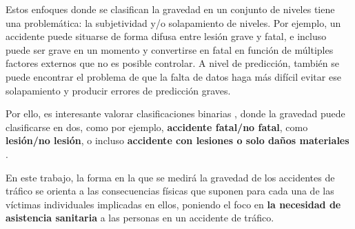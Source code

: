 Estos enfoques donde se clasifican la gravedad en un conjunto de niveles tiene una problemática: la subjetividad y/o solapamiento de niveles. Por ejemplo, un accidente puede situarse de forma difusa entre lesión grave y fatal, e incluso puede ser grave en un momento y convertirse en fatal en función de múltiples factores externos que no es posible controlar. A nivel de predicción, también se puede encontrar el problema de que la falta de datos haga más difícil evitar ese solapamiento y producir errores de predicción graves.

Por ello, es interesante valorar clasificaciones binarias \cite{prati2017using, hosseinzadeh2021investigating}, donde la gravedad puede clasificarse en dos, como por ejemplo, \textbf{accidente fatal/no fatal}, como \textbf{lesión/no lesión}, o incluso \textbf{accidente con lesiones o solo daños materiales }\cite{zhang2022hybrid, ma2021analytic}.



En este trabajo, la forma en la que se medirá la gravedad de los accidentes de tráfico se orienta a las consecuencias físicas que suponen para cada una de las víctimas individuales implicadas en ellos, poniendo el foco en \textbf{la necesidad de asistencia sanitaria} a las personas en un accidente de tráfico.




